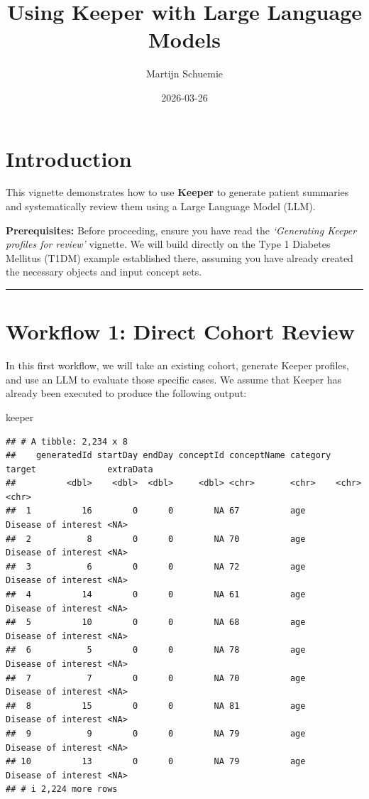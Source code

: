 \documentclass[
]{article}
\title{Using Keeper with Large Language Models}
\author{Martijn Schuemie}
\date{2026-03-26}
\newenvironment{Shaded}{\begin{snugshade}}{\end{snugshade}}
\newcommand{\NormalTok}[1]{#1}
\begin{document}
\maketitle

{
\setcounter{tocdepth}{2}
\tableofcontents
}
\section{Introduction}\label{introduction}

This vignette demonstrates how to use \textbf{Keeper} to generate
patient summaries and systematically review them using a Large Language
Model (LLM).

\textbf{Prerequisites:} Before proceeding, ensure you have read the
\emph{`Generating Keeper profiles for review'} vignette. We will build
directly on the Type 1 Diabetes Mellitus (T1DM) example established
there, assuming you have already created the necessary objects and input
concept sets.

\begin{center}\rule{0.5\linewidth}{0.5pt}\end{center}

\section{Workflow 1: Direct Cohort
Review}\label{workflow-1-direct-cohort-review}

In this first workflow, we will take an existing cohort, generate Keeper
profiles, and use an LLM to evaluate those specific cases. We assume
that Keeper has already been executed to produce the following output:

\begin{Shaded}
\begin{Highlighting}[]
\NormalTok{keeper}
\end{Highlighting}
\end{Shaded}

\begin{verbatim}
## # A tibble: 2,234 x 8
##    generatedId startDay endDay conceptId conceptName category target              extraData
##          <dbl>    <dbl>  <dbl>     <dbl> <chr>       <chr>    <chr>               <chr>    
##  1          16        0      0        NA 67          age      Disease of interest <NA>     
##  2           8        0      0        NA 70          age      Disease of interest <NA>     
##  3           6        0      0        NA 72          age      Disease of interest <NA>     
##  4          14        0      0        NA 61          age      Disease of interest <NA>     
##  5          10        0      0        NA 68          age      Disease of interest <NA>     
##  6           5        0      0        NA 78          age      Disease of interest <NA>     
##  7           7        0      0        NA 70          age      Disease of interest <NA>     
##  8          15        0      0        NA 81          age      Disease of interest <NA>     
##  9           9        0      0        NA 79          age      Disease of interest <NA>     
## 10          13        0      0        NA 79          age      Disease of interest <NA>     
## # i 2,224 more rows
\end{verbatim}
\end{document}
